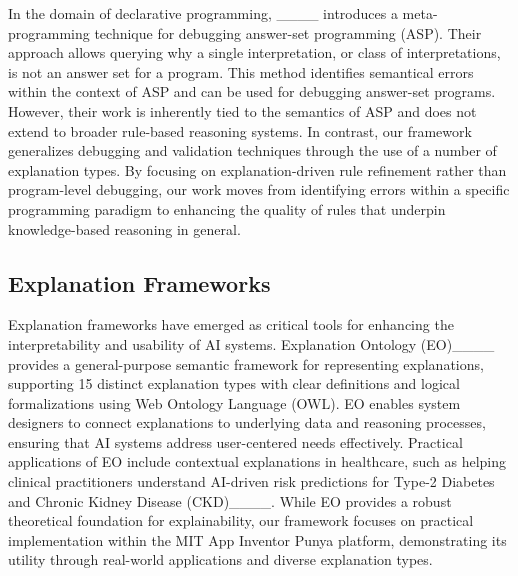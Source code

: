 In the domain of declarative programming, ____ introduces a meta-programming technique for debugging answer-set programming (ASP). Their approach allows querying why a single interpretation, or class of interpretations, is not an answer set for a program.
This method identifies semantical errors within the context of ASP and can be used for debugging answer-set programs.
However, their work is inherently tied to the semantics of ASP and does not extend to broader rule-based reasoning systems. %
In contrast, our framework generalizes debugging and validation techniques through the use of a number of explanation types.
By focusing on explanation-driven rule refinement rather than program-level debugging, our work moves from identifying errors within a specific programming paradigm to enhancing the quality of rules that underpin knowledge-based reasoning in general. 

\subsection{Explanation Frameworks}

Explanation frameworks have emerged as critical tools for enhancing the interpretability and usability of AI systems. Explanation Ontology (EO)____ provides a general-purpose semantic framework for representing explanations, supporting 15 distinct explanation types with clear definitions and logical formalizations using Web Ontology Language (OWL). EO enables system designers to connect explanations to underlying data and reasoning processes, ensuring that AI systems address user-centered needs effectively. Practical applications of EO include contextual explanations in healthcare, such as helping clinical practitioners understand AI-driven risk predictions for Type-2 Diabetes and Chronic Kidney Disease (CKD)____. While EO provides a robust theoretical foundation for explainability, our framework focuses on practical implementation within the MIT App Inventor Punya platform, demonstrating its utility through real-world applications and diverse explanation types.


